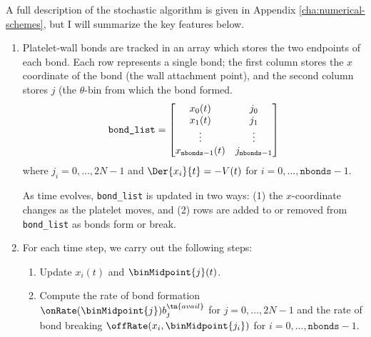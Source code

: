 A full description of the stochastic algorithm is given in Appendix
\ref{cha:numerical-schemes}, but I will summarize the key features
below.
\begin{enumerate}
\item Platelet-wall bonds are tracked in an array which stores the two
  endpoints of each bond. Each row represents a single bond; the first
  column stores the $x$ coordinate of the bond (the wall attachment
  point), and the second column stores $j$ (the $\theta$-bin from which
  the bond formed.
  \begin{equation}
    \label{eq:bond-list}
    \verb|bond_list| =
    \begin{bmatrix}
      x_0(t) & j_0 \\
      x_1(t) & j_1 \\
      \vdots & \vdots \\
      x_{\texttt{nbonds}-1}(t) & j_{\texttt{nbonds} - 1}
    \end{bmatrix}    
  \end{equation}
  where $j_i = 0, \hdots, 2N-1$ and $\Der{x_i}{t} = -V(t)$ for $i = 0,
  \hdots, \texttt{nbonds} - 1$.

  As time evolves, \verb|bond_list| is updated in two ways: (1) the
  $x$-coordinate changes as the platelet moves, and (2) rows are added
  to or removed from \verb|bond_list| as bonds form or break.

\item For each time step, we carry out the following steps:
  \begin{enumerate}
  \item Update $x_i(t)$ and $\binMidpoint{j}(t)$.
  \item Compute the rate of bond formation $\onRate(\binMidpoint{j})
    b_j^\tn{avail}$ for $j = 0, \hdots, 2N-1$ and the rate of bond
    breaking $\offRate(x_i, \binMidpoint{j_i})$ for $i = 0, \hdots,
    \texttt{nbonds} - 1$.
  \end{enumerate}
\end{enumerate}
